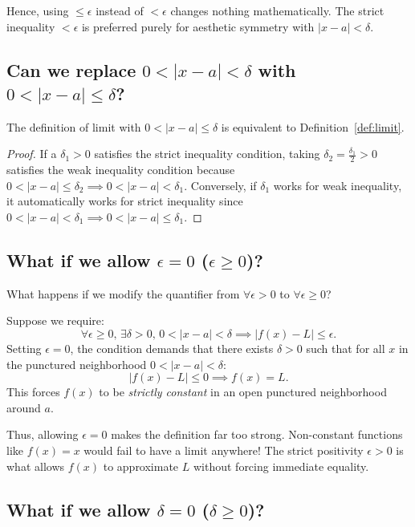 \documentclass{essay}
\begin{document}
Hence, using $\le \epsilon$ instead of $< \epsilon$ changes nothing mathematically. The strict inequality $< \epsilon$ is preferred purely for aesthetic symmetry with $|x - a| < \delta$.

\subsection{Can we replace $0 < |x - a| < \delta$ with $0 < |x - a| \le \delta$?}

\begin{theorem}
The definition of limit with $0 < |x - a| \le \delta$ is equivalent to Definition~\ref{def:limit}.
\end{theorem}

\begin{proof}
If a $\delta_1 > 0$ satisfies the strict inequality condition, taking $\delta_2 = \frac{\delta_1}{2} > 0$ satisfies the weak inequality condition because $0 < |x - a| \le \delta_2 \implies 0 < |x - a| < \delta_1$. Conversely, if $\delta_1$ works for weak inequality, it automatically works for strict inequality since $0 < |x - a| < \delta_1 \implies 0 < |x - a| \le \delta_1$.
\end{proof}

\subsection{What if we allow $\epsilon = 0$ ($\epsilon \ge 0$)?}

What happens if we modify the quantifier from $\forall \epsilon > 0$ to $\forall \epsilon \ge 0$?

Suppose we require:
\[
\forall \epsilon \ge 0, \, \exists \delta > 0, \, 0 < |x - a| < \delta \implies |f(x) - L| \le \epsilon.
\]
Setting $\epsilon = 0$, the condition demands that there exists $\delta > 0$ such that for all $x$ in the punctured neighborhood $0 < |x - a| < \delta$:
\[
|f(x) - L| \le 0 \implies f(x) = L.
\]
This forces $f(x)$ to be \emph{strictly constant} in an open punctured neighborhood around $a$.

Thus, allowing $\epsilon = 0$ makes the definition far too strong. Non-constant functions like $f(x) = x$ would fail to have a limit anywhere! The strict positivity $\epsilon > 0$ is what allows $f(x)$ to approximate $L$ without forcing immediate equality.

\subsection{What if we allow $\delta = 0$ ($\delta \ge 0$)?}
\end{document}
